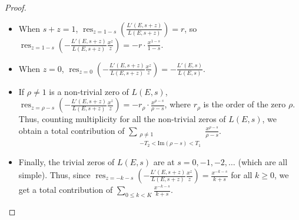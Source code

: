 \documentclass[12pt,reqno]{amsart}
\theoremstyle{definition}
\numberwithin{equation}{section}
\renewcommand{\Im}{\mathrm{Im}}
\def\res{\mathop{\mathrm{res}}}
\begin{document}
\begin{proof}
\begin{itemize}
\item When $s+z=1$, $\displaystyle{\res_{z=1-s} \left( \frac{L'(E, s+z)}{L(E,s+z)} \right)=r}$,   so   $\displaystyle{\res_{z=1-s} \left( - \frac{L'(E, s+z)}{L(E,s+z)} \frac{x^z}{z} \right)=-r \cdot \frac{x^{1-s}}{1-s}}$. 

\item When $z=0$, $\displaystyle{\res_{z=0} \left( - \frac{L'(E, s+z)}{L(E,s+z)} \frac{x^z}{z} \right)=-\frac{L'(E, s)}{L(E, s)}}$. 
\item If $\rho \neq 1$ is a non-trivial zero of $L(E, s)$, $\displaystyle{\res_{z=\rho-s} \left( - \frac{L'(E, s+z)}{L(E,s+z)} \frac{x^z}{z} \right)=- r_{\rho} \cdot \frac{x^{\rho-s}}{\rho-s}}$, where $r_\rho$ is the order of the zero $\rho$. Thus, counting multiplicity for all the non-trivial zeros of $L(E,s)$, we obtain a total contribution of $\displaystyle{\sum_{\substack{\rho \neq 1 \\ -T_2 < \Im (\rho -s) < T_1}}\frac{x^{\rho-s}}{\rho-s}}$. 
\item Finally, the trivial zeros of $L(E, s)$ are at $s=0, -1, -2, \ldots$ (which are all simple).  Thus, since  $\displaystyle{\res_{z=-k-s} \left( - \frac{L'(E, s+z)}{L(E,s+z)} \frac{x^z}{z} \right)=\frac{x^{-k-s}}{k+s}}$ for all $k \geq 0$, we get a total contribution of $\displaystyle{\sum_{0 \leq k < K} \frac{x^{-k-s}}{k+s}}$. 
\end{itemize}


\end{proof}
\end{document}
